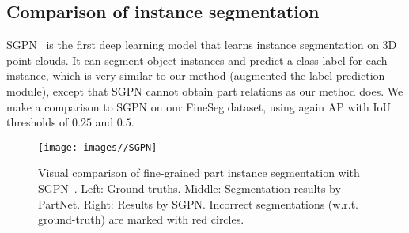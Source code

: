 
\subsection{Comparison of instance segmentation}
SGPN~\cite{Wang2017SGPN} is the first deep learning model that learns instance segmentation on 3D point clouds. It can segment object instances and predict a class label for each instance, which is very similar to our method (augmented the label prediction module), except that SGPN cannot obtain part relations as our method does. We make a comparison to SGPN on our FineSeg dataset, using again AP with IoU thresholds of $0.25$ and $0.5$.

\begin{figure}[t]
  \centering
  \texttt{[image: images//SGPN]}
  \caption{Visual comparison of fine-grained part instance segmentation with SGPN~\cite{Wang2017SGPN}. Left: Ground-truths. Middle: Segmentation results by PartNet. Right: Results by SGPN. Incorrect segmentations (w.r.t. ground-truth) are marked with red circles.}
  \label{sgpn_figure}\vspace{-5pt}
\end{figure}

